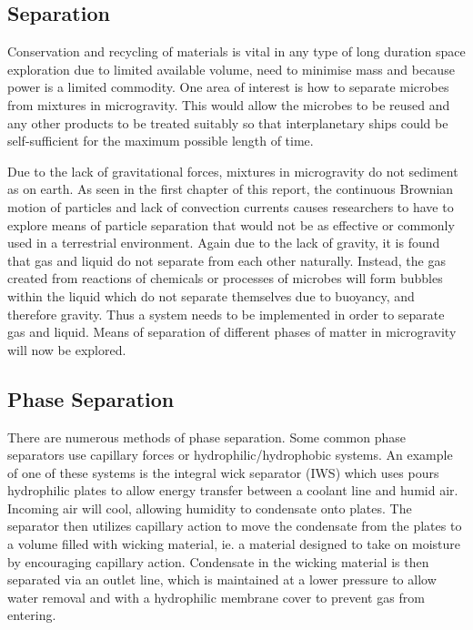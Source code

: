 \documentclass[12pt]{article}
\begin{document}
\subsection{Separation}

Conservation and recycling of materials is vital in any type of long duration space exploration due to limited available volume, need to minimise mass and because power is a limited commodity. One area of interest is how to separate microbes from mixtures in microgravity. This would allow the microbes to be reused and any other products to be treated suitably so that interplanetary ships could be self-sufficient for the maximum possible length of time.

Due to the lack of gravitational forces, mixtures in microgravity do not sediment as on earth. As seen in the first chapter of this report, the continuous Brownian motion of particles and lack of convection currents causes researchers to have to explore means of particle separation that would not be as effective or commonly used in a terrestrial environment. Again due to the lack of gravity, it is found that gas and liquid do not separate from each other naturally. Instead, the gas created from reactions of chemicals or processes of microbes will form bubbles within the liquid which do not separate themselves due to buoyancy, and therefore gravity. Thus a system needs to be implemented in order to separate gas and liquid. Means of separation of different phases of matter in microgravity will now be explored.

\subsection{Phase Separation}
There are numerous methods of phase separation. Some common phase separators use capillary forces or hydrophilic/hydrophobic systems. An example of one of these systems is the integral wick separator (IWS) which uses pours hydrophilic plates to allow energy transfer between a coolant line and humid air. Incoming air will cool, allowing humidity to condensate onto plates. The separator then utilizes capillary action to move the condensate from the plates to a volume filled with wicking material, ie. a material designed to take on moisture by encouraging capillary action. Condensate in the wicking material is then separated via an outlet line, which is maintained at a lower pressure to allow water removal and with a hydrophilic membrane cover to prevent gas from entering.\cite{ellis2013tangential}
\end{document}
